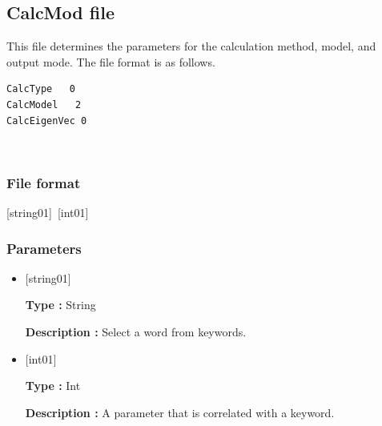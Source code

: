 \subsection{CalcMod file}
\label{Subsec:calcmod}
This file determines the parameters for the calculation method, model, and output mode. The file format is as follows.\\
\begin{minipage}{10cm}
\begin{screen}
\begin{verbatim}
CalcType   0
CalcModel   2
CalcEigenVec 0
\end{verbatim}
\end{screen}
\end{minipage}
\\
\subsubsection{File format}
[string01]~[int01]
\subsubsection{Parameters}
 \begin{itemize}
   \item  $[$string01$]$
   
   {\bf Type :} String
   
   {\bf Description :} Select a word from keywords.
   
   \item  $[$int01$]$
   
    {\bf Type :} Int 

   {\bf Description :} A parameter that is correlated with a keyword.\\

   
  \end{itemize}

